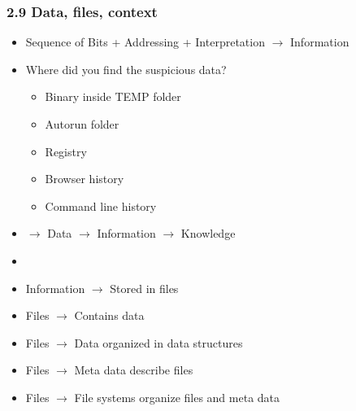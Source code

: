 \begin{frame}
  \frametitle{2.9 Data, files, context}
    \begin{itemize}
        \item Sequence of Bits + Addressing + Interpretation $\to$ Information
        \item Where did you find the suspicious data?
            \begin{itemize}
                \item Binary inside TEMP folder
                \item Autorun folder
                \item Registry
                \item Browser history
                \item Command line history
            \end{itemize}
        \item [] $\to$ Data $\to$ Information $\to$ Knowledge
	\item[] 
        \item Information $\to$ Stored in files
	\item Files $\to$ Contains data
	\item Files $\to$ Data organized in data structures
	\item Files $\to$ Meta data describe files
        \item Files $\to$ File systems organize files and meta data
    \end{itemize}
\end{frame}









